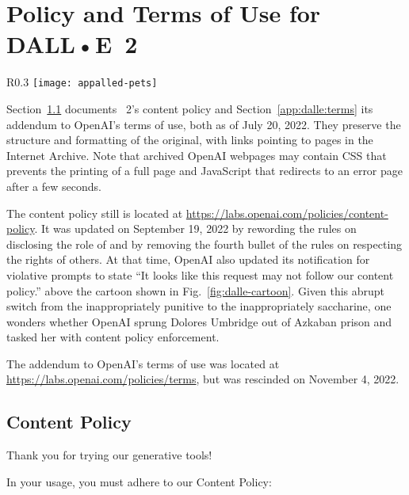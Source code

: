 \section{Policy and Terms of Use for DALL•E~2}
\label{app:dalle-sources}

\begin{wrapfigure}[9]{R}{0.3\textwidth}
\centering
\texttt{[image: appalled-pets]}
\caption{Be nice to \DALLE's pets!}\label{fig:dalle-cartoon}
\end{wrapfigure}

Section~\ref{app:dalle-content-policy} documents \DALLE~2's content policy and
Section~\ref{app:dalle:terms} its addendum to OpenAI's terms of use, both as of
July 20, 2022. They preserve the structure and formatting of the original, with
links pointing to pages in the Internet Archive. Note that archived OpenAI
webpages may contain CSS that prevents the printing of a full page and
JavaScript that redirects to an error page after a few seconds.

The content policy still is located at
\url{https://labs.openai.com/policies/content-policy}. It was updated on
September 19, 2022 by rewording the rules on disclosing the role of \AI{} and by
removing the fourth bullet of the rules on respecting the rights of others. At
that time, OpenAI also updated its notification for violative prompts to state
``It looks like this request may not follow our content policy.'' above the
cartoon shown in Fig.~\ref{fig:dalle-cartoon}. Given this abrupt switch from the
inappropriately punitive to the inappropriately saccharine, one wonders whether
OpenAI sprung Dolores Umbridge out of Azkaban prison and tasked her with content
policy enforcement.

The addendum to OpenAI's terms of use was located at
\url{https://labs.openai.com/policies/terms}, but was rescinded on November 4,
2022.


\subsection{Content Policy}
\label{app:dalle-content-policy}

Thank you for trying our generative \AI{} tools!

\noindent In your usage, you must adhere to our Content Policy:

